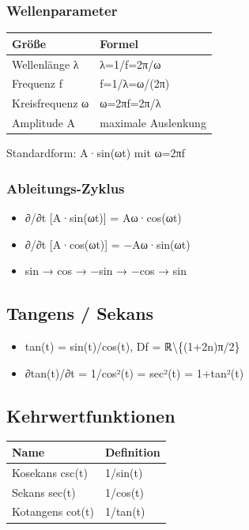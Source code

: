 \documentclass[11pt, a4paper]{article}
\begin{document}
\subsubsection{Wellenparameter}

{\small
\begin{tabularx}{\linewidth}{XX}
\hline
\rowcolor{tableheadbg}
{\color{white}\textbf{Größe}} & {\color{white}\textbf{Formel}} \\[2pt]
\hline
\endhead
\hline
\endfoot
Wellenlänge λ & λ=1/f=2π/ω \\
Frequenz f & f=1/λ=ω/(2π) \\
Kreisfrequenz ω & ω=2πf=2π/λ \\
Amplitude A & maximale Auslenkung \\
\end{tabularx}
}


Standardform: A·sin(ωt) mit ω=2πf



\subsubsection{Ableitungs-Zyklus}
\begin{itemize}
  \item ∂/∂t [A·sin(ωt)] = Aω·cos(ωt)
  \item ∂/∂t [A·cos(ωt)] = −Aω·sin(ωt)
  \item sin → cos → −sin → −cos → sin
\end{itemize}


\subsection{Tangens / Sekans}
\begin{itemize}
  \item tan(t) = sin(t)/cos(t), Df = ℝ\textbackslash{}\{(1+2n)π/2\}
  \item ∂tan(t)/∂t = 1/cos²(t) = sec²(t) = 1+tan²(t)
\end{itemize}


\subsection{Kehrwertfunktionen}

{\small
\begin{tabularx}{\linewidth}{XX}
\hline
\rowcolor{tableheadbg}
{\color{white}\textbf{Name}} & {\color{white}\textbf{Definition}} \\[2pt]
\hline
\endhead
\hline
\endfoot
Kosekans csc(t) & 1/sin(t) \\
Sekans sec(t) & 1/cos(t) \\
Kotangens cot(t) & 1/tan(t) \\
\end{tabularx}
}
\end{document}

